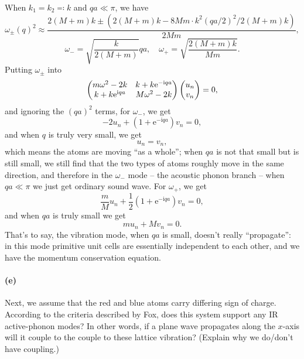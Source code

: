 \documentclass[hyperref, a4paper]{article}
\newcommand*{\ii}{\mathrm{i}}
\newcommand*{\ee}{\mathrm{e}}
\begin{document}
When $k_1 = k_2 \eqqcolon k$ and $qa \ll \pi$, we have 
\begin{equation}
    \omega_\pm(q)^2 \approx
    \frac{
        2(M+m)k \pm (2(M+m)k - 8 Mm \cdot k^2 (qa/2)^2 / 2(M+m)k) 
    }{2Mm},
\end{equation}
\begin{equation}
    \omega_- = \sqrt{\frac{k}{2 (M+m)}} q a, \quad 
    \omega_+ = \sqrt{\frac{2 (M+m) k}{Mm}}.
\end{equation}
Putting $\omega_{\pm}$ into
\begin{equation}
    \pmqty{
        m \omega^2 - 2k     &   k + k \ee^{- \ii q a} \\
        k + k \ee^{\ii q a} &  M \omega^2 - 2k
    } \pmqty{
        u_n \\ v_n
    } = 0,
\end{equation}
and ignoring the $(qa)^2$ terms, for $\omega_-$, we get 
\begin{equation}
    - 2 u_n + (1 + \ee^{- \ii q a}) v_n = 0,
\end{equation}
and when $q$ is truly very small, we get 
\begin{equation}
    u_n = v_n,
\end{equation}
which means the atoms are moving ``as a whole'';
when $q a$ is not that small but is still small, 
we still find that the two types of atoms roughly move in the same direction, 
and therefore in the $\omega_-$ mode -- the acoustic phonon branch -- 
when $qa \ll \pi$ we just get ordinary sound wave.
For $\omega_+$, we get 
\begin{equation}
    \frac{m}{M} u_n + \frac{1}{2} (1 + \ee^{- \ii q a}) v_n = 0,
\end{equation}
and when $qa$ is truly small we get 
\begin{equation}
    m u_n + M v_n = 0.
\end{equation}
That's to say, the vibration mode, when $qa$ is small, doesn't really ``propagate'': 
in this mode primitive unit cells are essentially independent to each other, 
and we have the momentum conservation equation. 

\paragraph*{(e)} Next, we assume that the red and blue atoms carry differing sign of charge. According to the criteria described by Fox, does this system support any IR active-phonon modes? In other words, if a plane wave propagates along the $x$-axis will it couple to the couple to these lattice vibration? (Explain why we do/don't have coupling.)
\end{document}
